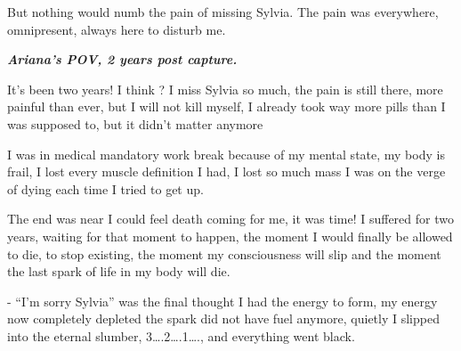 \documentclass[colorlinks,12pt,a4paper]{book}
\begin{document}
But nothing would numb the pain of missing Sylvia. The pain was everywhere, omnipresent, always here to disturb me.\par
\bigskip 

\textit{\textbf{Ariana's POV, 2 years post capture.}}

It's been two years! I think ? I miss Sylvia so much, the pain is still there, more painful than ever, but I will not kill 
myself, I already took way more pills than I was supposed to, but it didn't matter anymore\par
\bigskip

I was in medical mandatory work break because of my mental state, my body is frail, I lost every muscle definition I had, 
I lost so much mass I was on the verge of dying each time I tried to get up.\par
\bigskip

The end was near I could feel death coming for me, it was time! I suffered for two years, waiting for that moment to happen,
 the moment I would finally be allowed to die, to stop existing, the moment my consciousness will slip and the moment the
  last spark of life in my body will die.\par
  \bigskip

- “I'm sorry Sylvia” was the final thought I had the energy to form, my energy now completely depleted the spark did not
 have fuel anymore, quietly I slipped into the eternal slumber, 3….2….1…., and everything went black.\par
 \bigskip

\printglossaries
\end{document}
